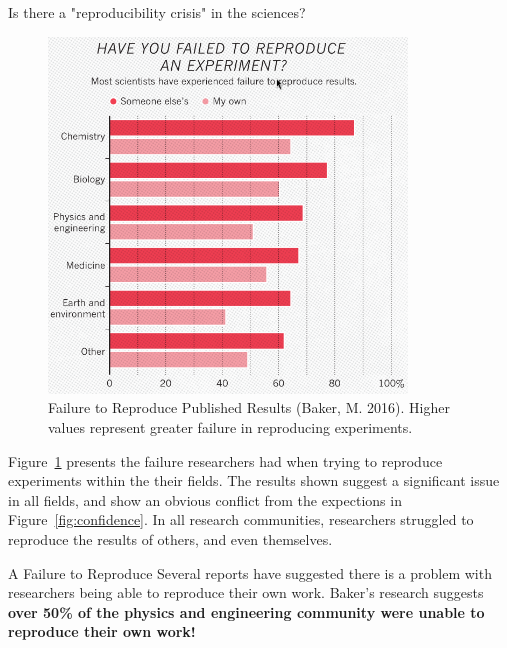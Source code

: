 \documentclass[final]{beamer}
\newlength{\colwidth}
\begin{document}
\begin{frame}[t]
\begin{columns}[t]
\begin{column}{\colwidth}
\begin{block}{Is there a "reproducibility crisis" in the sciences?}
    \begin{figure}
      \centering
      \includegraphics[width=0.85\textwidth]{tess2024/Nature-Reproducibility-Failure-.png}
      \caption{Failure to Reproduce Published Results (Baker, M. 2016)\cite{baker2016}.
      Higher values represent greater failure in reproducing experiments.}
      \label{fig:failure}
    \end{figure}
    
    Figure~\ref*{fig:failure} presents the failure researchers had when trying
    to reproduce experiments within the their fields.
    The results shown suggest a significant issue in all fields, and show an
    obvious conflict from the expections in Figure~\ref*{fig:confidence}.
    In all research communities, researchers struggled to reproduce the results
    of others, and even themselves.

  \end{block}

  \begin{alertblock}{A Failure to Reproduce}
    Several reports have suggested there is a problem with researchers being
    able to reproduce their own work.
    Baker's research\cite{baker2016} suggests \textbf{over 50\% of the physics
    and engineering community were unable to reproduce their own work!}

  \end{alertblock}


\end{column}
\end{columns}
\end{frame}
\end{document}
